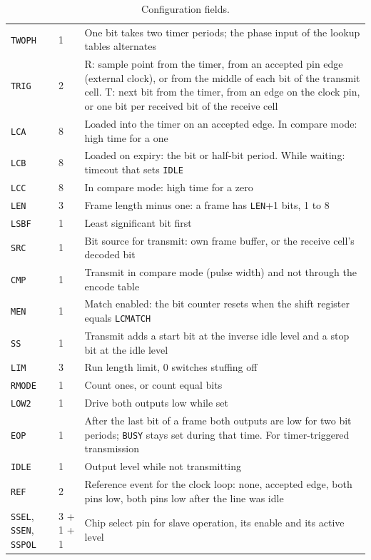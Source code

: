 \documentclass[10pt,a4paper]{article}
\newcommand{\reg}[1]{\texttt{#1}}
\begin{document}
\begin{table}[H]
\begin{tabularx}{\linewidth}{@{}llL@{}}
\reg{TWOPH} & 1 & One bit takes two timer periods; the phase input of the lookup tables alternates \\
\reg{TRIG} & 2 & R: sample point from the timer, from an accepted pin edge (external clock), or from the middle of each bit of the transmit cell. T: next bit from the timer, from an edge on the clock pin, or one bit per received bit of the receive cell \\
\reg{LCA} & 8 & Loaded into the timer on an accepted edge. In compare mode: high time for a one \\
\reg{LCB} & 8 & Loaded on expiry: the bit or half-bit period. While waiting: timeout that sets \reg{IDLE} \\
\reg{LCC} & 8 & In compare mode: high time for a zero \\
\midrule
\reg{LEN} & 3 & Frame length minus one: a frame has \reg{LEN}+1 bits, 1 to 8 \\
\reg{LSBF} & 1 & Least significant bit first \\
\reg{SRC} & 1 & Bit source for transmit: own frame buffer, or the receive cell's decoded bit \\
\reg{CMP} & 1 & Transmit in compare mode (pulse width) and not through the encode table \\
\reg{MEN} & 1 & Match enabled: the bit counter resets when the shift register equals \reg{LCMATCH} \\
\reg{SS} & 1 & Transmit adds a start bit at the inverse idle level and a stop bit at the idle level \\
\reg{LIM} & 3 & Run length limit, 0 switches stuffing off \\
\reg{RMODE} & 1 & Count ones, or count equal bits \\
\reg{LOW2} & 1 & Drive both outputs low while set \\
\reg{EOP} & 1 & After the last bit of a frame both outputs are low for two bit periods; \reg{BUSY} stays set during that time. For timer-triggered transmission \\
\reg{IDLE} & 1 & Output level while not transmitting \\
\reg{REF} & 2 & Reference event for the clock loop: none, accepted edge, both pins low, both pins low after the line was idle \\
\reg{SSEL}, \reg{SSEN}, \reg{SSPOL} & 3 + 1 + 1 & Chip select pin for slave operation, its enable and its active level \\
\bottomrule
\end{tabularx}
\caption{Configuration fields.}
\label{tab:fields}
\end{table}
\end{document}
